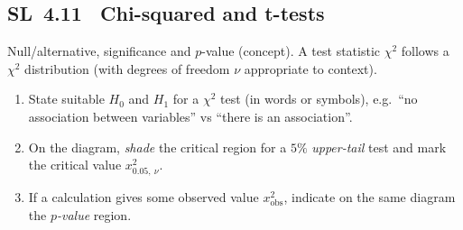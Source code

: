 \documentclass[11pt]{article}
\def\textbf#1{#1}%
\newcommand{\tocsubsection}[1]{\subsection{#1}}
\newcounter{question}
\begin{document}
\tocsubsection{SL 4.11 \; Chi-squared and t-tests}


\begin{question}
\textbf{Null/alternative, significance and $p$-value (concept).} A test statistic $\chi^2$ follows a $\chi^2$ distribution
(with degrees of freedom $\nu$ appropriate to context).

\begin{enumerate}
  \item State suitable $H_0$ and $H_1$ for a $\chi^2$ test (in words or symbols), e.g.\ “no association between variables” vs “there is an association”.
  \item On the diagram, \emph{shade} the \textbf{critical region} for a $5\%$ \emph{upper-tail} test and mark the critical value $x^2_{0.05,\ \nu}$.
  \item If a calculation gives some observed value $x^2_{\text{obs}}$, indicate on the same diagram the \emph{$p$-value} region.
\end{enumerate}

\begin{center}
\end{center}
\end{question}
\end{document}
